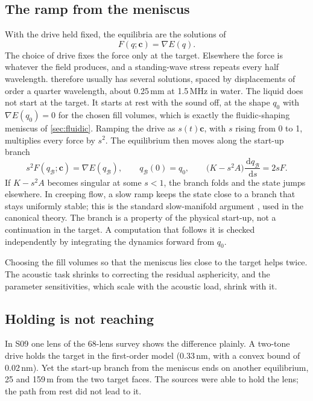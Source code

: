 \documentclass[11pt,a4paper]{article}
\numberwithin{equation}{section}
\newcommand{\dd}{\,\mathrm d}
\begin{document}
\subsection{The ramp from the meniscus}
With the drive held fixed, the equilibria are the solutions of
\begin{equation}
 F(q;\bm c)=\nabla E(q).
 \label{eq:held}
\end{equation}
The choice of drive fixes the force only at the target. Elsewhere the force is
whatever the field produces, and a standing-wave stress repeats every half
wavelength.  therefore usually has several solutions, spaced by
displacements of order a quarter wavelength, about 0.25\,mm at 1.5\,MHz in
water. The liquid does not start at the target. It starts at rest with the sound
off, at the shape $q_0$ with $\nabla E(q_0)=0$ for the chosen fill volumes,
which is exactly the fluidic-shaping meniscus of \cref{sec:fluidic}. Ramping the
drive as $s(t)\bm c$, with $s$ rising from 0 to 1, multiplies every force by
$s^2$. The equilibrium then moves along the start-up branch
\begin{equation}
 s^2F(q_{\mathcal B};\bm c)=\nabla E(q_{\mathcal B}),\qquad
 q_{\mathcal B}(0)=q_0,\qquad
 \bigl(K-s^2A\bigr)\frac{\dd q_{\mathcal B}}{\dd s}=2sF .
 \label{eq:branch}
\end{equation}
If $K-s^2A$ becomes singular at some $s<1$, the branch folds and the state jumps
elsewhere. In creeping flow, a slow ramp keeps the state close to a branch that
stays uniformly stable; this is the standard slow-manifold argument
\cite{fenichel1979}, used in the canonical theory. The branch is a property of
the physical start-up, not a continuation in the target. A computation that
follows it is checked independently by integrating the dynamics forward from
$q_0$.

Choosing the fill volumes so that the meniscus lies close to the target helps
twice. The acoustic task shrinks to correcting the residual asphericity, and the
parameter sensitivities, which scale with the acoustic load, shrink with it.

\subsection{Holding is not reaching}
In S09 one lens of the 68-lens survey shows the difference plainly. A two-tone
drive holds the target in the first-order model (0.33\,nm, with a convex bound
of 0.02\,nm). Yet the start-up branch from the meniscus ends on another
equilibrium, 25 and 159\,\textmu m from the two target faces. The sources were
able to hold the lens; the path from rest did not lead to it.
\end{document}
